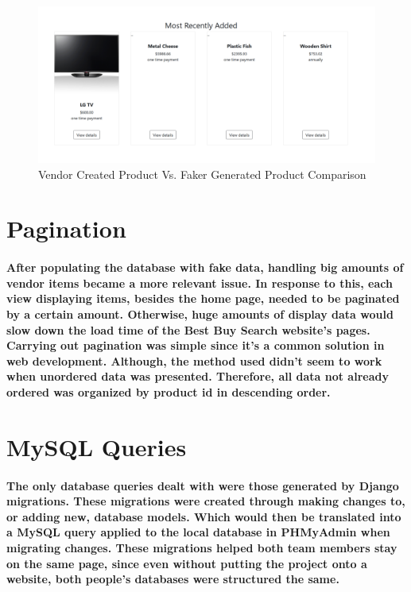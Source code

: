 \documentclass[sigconf]{acmart}
\begin{document}
\begin{figure}[H]
    \centering
    \includegraphics[scale=0.2]{VendorCreatedVFaker.PNG}
    \caption{Vendor Created Product Vs. Faker Generated Product Comparison}
    \label{fig:my_label}
\end{figure}

\section{Pagination}

\paragraph{ After populating the database with fake data, handling big amounts of vendor items became a more relevant issue. In response to this, each view displaying items, besides the home page, needed to be paginated by a certain amount. Otherwise, huge amounts of display data would slow down the load time of the Best Buy Search website's pages. Carrying out pagination was simple since it's a common solution in web development. Although, the method used didn't seem to work when unordered data was presented. Therefore, all data not already ordered was organized by product id in descending order. }

\section{MySQL Queries}

\paragraph{ The only database queries dealt with were those generated by Django migrations. These migrations were created through making changes to, or adding new, database models. Which would then be translated into a MySQL query applied to the local database in PHMyAdmin when migrating changes. These migrations helped both team members stay on the same page, since even without putting the project onto a website, both people's databases were structured the same. } 
\end{document}
